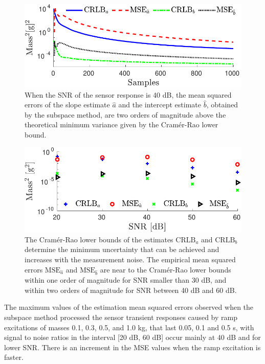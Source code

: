 {{\begin{figure}[!htbp]
\centering
\includegraphics[width=1\columnwidth]{./ChapterRampInput/fig/Fig_5.pdf} 
\caption{ \label{fig:CRLB_MSE_ab_dd_40dB_MC_10000} When the SNR of the sensor response is 40 dB, the mean squared errors of the slope estimate $\widehat{a}$ and the intercept estimate $\widehat{b}$, obtained by the subspace method, are two orders of magnitude above the theoretical minimum variance given by the Cram\'er-Rao lower bound.}
\end{figure}


\begin{figure}[!htbp]
\centering
\includegraphics[width=1\columnwidth]{./ChapterRampInput/fig/Fig_6.pdf} 
\caption{ \label{fig:CRLB_MSE_SNR_ab_dd_MC_10000} The Cram\'er-Rao lower bounds of the estimates $\mathrm{CRLB}_a$ and $\mathrm{CRLB}_b$ determine the minimum uncertainty that can be achieved and increases with the measurement noise. 
The empirical mean squared errors $\mathrm{MSE}_{\hat{a}}$ and $\mathrm{MSE}_{\hat{b}}$ are near to the Cram\'er-Rao lower bounds within one order of magnitude for SNR smaller than 30 dB, and within two orders of magnitude for SNR between 40 dB and 60 dB. }
\end{figure}


\begin{table}[h!]
\centering
\caption{ The maximum values of the estimation mean squared errors observed when the subspace method processed the sensor transient responses caused by ramp excitations of masses 0.1, 0.3, 0.5, and 1.0 kg, that last 0.05, 0.1 and 0.5 s, with signal to noise ratios in the interval [20 dB, 60 dB] occur mainly at 40 dB and for lower SNR. There is an increment in the MSE values when the ramp excitation is faster.}
 

\end{table}}}
